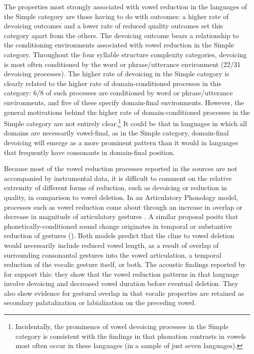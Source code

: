   The properties most strongly associated with vowel reduction in the languages of the Simple category are those having to do with outcomes: a higher rate of devoicing outcomes and a lower rate of reduced quality outcomes set this category apart from the others. The devoicing outcome bears a relationship to the conditioning environments associated with vowel reduction in the Simple category. Throughout the four syllable structure complexity categories, devoicing is most often conditioned by the word or phrase/utterance environment (22/31 devoicing processes). The higher rate of devoicing in the Simple category is clearly related to the higher rate of domain-conditioned processes in this category: 6/8 of such processes are conditioned by word or phrase/utterance environments, and five of these specify domain-final environments. However, the general motivations behind the higher rate of domain-conditioned processes in the Simple category are not entirely clear.\footnote{{Incidentally, the prominence of vowel devoicing processes in the Simple category is consistent with the findings in  that phonation contrasts in vowels most often occur in these languages (in a sample of just seven languages).}} It could be that in languages in which all domains are necessarily vowel-final, as in the Simple category, domain-final devoicing will emerge as a more prominent pattern than it would in languages that frequently have consonants in domain-final position.

  Because most of the vowel reduction processes reported in the sources are not accompanied by instrumental data, it is difficult to comment on the relative extremity of different forms of reduction, such as devoicing or reduction in quality, in comparison to vowel deletion. In an Articulatory Phonology model, processes such as vowel reduction come about through an increase in overlap or decrease in magnitude of articulatory gestures \citep{BrowmanGoldstein1992b}. A similar proposal posits that phonetically-conditioned sound change originates in temporal or substantive reduction of gestures (\citealt{MowreyPagliuca1995}). Both models predict that the cline to vowel deletion would necessarily include reduced vowel length, as a result of overlap of surrounding consonantal gestures into the vowel articulation, a temporal reduction of the vocalic gesture itself, or both. The acoustic findings reported by \citet{ChitoranBabaliyeva2007} for  support this: they show that the vowel reduction patterns in that language involve devoicing and decreased vowel duration before eventual deletion. They also show evidence for gestural overlap in that vocalic properties are retained as secondary palatalization or labialization on the preceding vowel.

